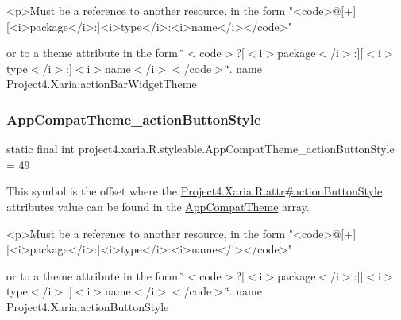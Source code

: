 \begin{DoxyVerb}      <p>Must be a reference to another resource, in the form "<code>@[+][<i>package</i>:]<i>type</i>:<i>name</i></code>"
\end{DoxyVerb}
 or to a theme attribute in the form \char`\"{}$<$code$>$?\mbox{[}$<$i$>$package$<$/i$>$\+:\mbox{]}\mbox{[}$<$i$>$type$<$/i$>$\+:\mbox{]}$<$i$>$name$<$/i$>$$<$/code$>$\char`\"{}.  name Project4.\+Xaria\+:action\+Bar\+Widget\+Theme \mbox{\label{classproject4_1_1xaria_1_1R_1_1styleable_ac0a46ce92a97f618843444fe78e175e5}} 
\subsubsection{\texorpdfstring{App\+Compat\+Theme\+\_\+action\+Button\+Style}{AppCompatTheme\_actionButtonStyle}}
{\footnotesize\ttfamily static final int project4.\+xaria.\+R.\+styleable.\+App\+Compat\+Theme\+\_\+action\+Button\+Style = 49\hspace{0.3cm}{\ttfamily [static]}}

This symbol is the offset where the \hyperlink{}{Project4.\+Xaria.\+R.\+attr\#action\+Button\+Style} attribute\textquotesingle{}s value can be found in the \hyperlink{classproject4_1_1xaria_1_1R_1_1styleable_aad8bec413e2350f9404e6ff0e831a85d}{App\+Compat\+Theme} array.

\begin{DoxyVerb}      <p>Must be a reference to another resource, in the form "<code>@[+][<i>package</i>:]<i>type</i>:<i>name</i></code>"
\end{DoxyVerb}
 or to a theme attribute in the form \char`\"{}$<$code$>$?\mbox{[}$<$i$>$package$<$/i$>$\+:\mbox{]}\mbox{[}$<$i$>$type$<$/i$>$\+:\mbox{]}$<$i$>$name$<$/i$>$$<$/code$>$\char`\"{}.  name Project4.\+Xaria\+:action\+Button\+Style \mbox{\label{classproject4_1_1xaria_1_1R_1_1styleable_a3ed86c6082101f35233a25e96d5bd2f3}} 
